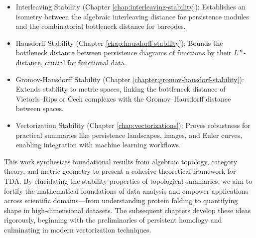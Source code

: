 \begin{itemize}
    \item Interleaving Stability (Chapter \ref{chap:interleaving-stability}): Establishes an isometry between the algebraic interleaving distance for persistence modules and the combinatorial bottleneck distance for barcodes.
    \item Hausdorff Stability (Chapter \ref{chap:hausdorff-stability}): Bounds the bottleneck distance between persistence diagrams of functions by their $L^{\infty}$-distance, crucial for functional data.
    \item Gromov-Hausdorff Stability (Chapter \ref{chapter:gromov-hausdorf-stability}): Extends stability to metric spaces, linking the bottleneck distance of Vietoris–Rips or Čech complexes with the Gromov–Hausdorff distance between spaces.
    \item Vectorization Stability (Chapter \ref{chap:vectorizations}): Proves robustness for practical summaries like persistence landscapes, images, and Euler curves, enabling integration with machine learning workflows.

\end{itemize}
This work synthesizes foundational results from algebraic topology, category theory, and metric geometry to present a cohesive theoretical framework for TDA. By elucidating the stability properties of topological summaries, we aim to fortify the mathematical foundations of data analysis and empower applications across scientific domains—from understanding protein folding to quantifying shape in high-dimensional datasets. The subsequent chapters develop these ideas rigorously, beginning with the preliminaries of persistent homology and culminating in modern vectorization techniques.